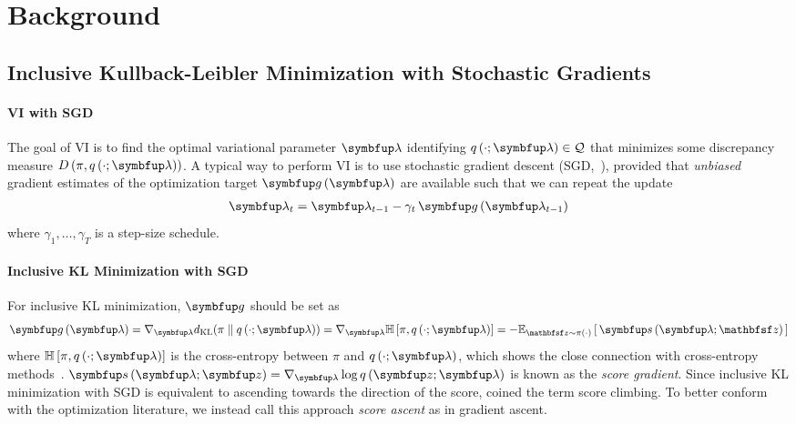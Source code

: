 
\vspace{-0.12in}
\section{Background}
\vspace{-0.07in}
\subsection{Inclusive Kullback-Leibler Minimization with Stochastic Gradients}\label{section:ivi_previous}
\vspace{-0.05in}
\paragraph{VI with SGD}
The goal of VI is to find the optimal variational parameter \(\vlambda\) identifying \(q\left(\cdot; \vlambda\right) \in \mathcal{Q}\) that minimizes some discrepancy measure \(D\left(\pi, q\left(\cdot; \vlambda\right)\right)\).
A typical way to perform VI is to use stochastic gradient descent (SGD,~\citealt{robbins_stochastic_1951}), provided that \textit{unbiased} gradient estimates of the optimization target \(\vg\,(\vlambda)\) are available such that we can repeat the update
{%
\begin{align*}
  \vlambda_{t} = \vlambda_{t-1} - \gamma_{t} \, \vg\left(\vlambda_{t-1}\right)
\end{align*}
}%
where \(\gamma_1, \ldots, \gamma_T\) is a step-size schedule.

\paragraph{Inclusive KL Minimization with SGD}
For inclusive KL minimization, \(\vg\) should be set as
%
{%
\begin{align*}
  \vg\left(\vlambda\right)
  = \nabla_{\vlambda} \DKL{\pi}{q\left(\cdot; \vlambda\right)}
  = \nabla_{\vlambda} \mathbb{H}\left[\pi, q\left(\cdot; \vlambda\right)\right]
  = -\Esub{\rvvz \sim \pi\left(\cdot\right)}{ \vs\,(\vlambda; \rvvz) } 
\end{align*}
}%
%
where \(\mathbb{H}\left[\pi, q\left(\cdot; \vlambda\right)\right]\) is the cross-entropy between \(\pi\) and \(q\left(\cdot; \vlambda\right)\), which shows the close connection with cross-entropy methods~\citep{}.
\(\vs\,(\vlambda;\vz) = \nabla_{\vlambda} \log q\,(\vz; \vlambda)\) is known as the \textit{score gradient}.
Since inclusive KL minimization with SGD is equivalent to ascending towards the direction of the score, \citet{NEURIPS2020_b2070693} coined the term score climbing.
To better conform with the optimization literature, we instead call this approach \textit{score ascent} as in gradient ascent.

